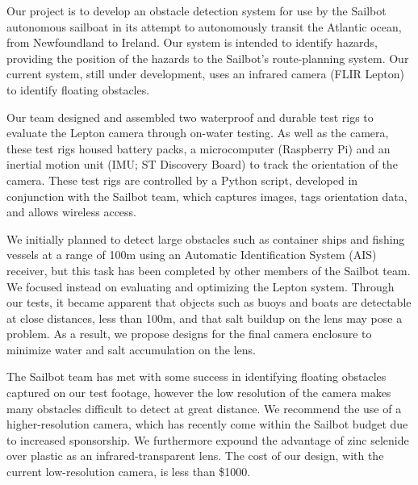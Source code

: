 Our project is to develop an obstacle detection system for use by the Sailbot autonomous sailboat in its attempt to autonomously transit the Atlantic ocean, from Newfoundland to Ireland. Our system is intended to identify hazards, providing the position of the hazards to the Sailbot's route-planning system. Our current system, still under development, uses an infrared camera (FLIR Lepton) to identify floating obstacles.

Our team designed and assembled two waterproof and durable test rigs to evaluate the Lepton camera through on-water testing. As well as the camera, these test rigs housed battery packs, a microcomputer (Raspberry Pi) and an inertial motion unit (IMU; ST Discovery Board) to track the orientation of the camera. These test rigs are controlled by a Python script, developed in conjunction with the Sailbot team, which captures images, tags orientation data, and allows wireless access.

We initially planned to detect large obstacles such as container ships and fishing vessels at a range of 100m using an Automatic Identification System (AIS) receiver, but this task has been completed by other members of the Sailbot team. We focused instead on evaluating and optimizing the Lepton system. Through our tests, it became apparent that objects such as buoys and boats are detectable at close distances, less than 100m, and that salt buildup on the lens may pose a problem. As a result, we propose designs for the final camera enclosure to minimize water and salt accumulation on the lens.

The Sailbot team has met with some success in identifying floating obstacles captured on our test footage, however the low resolution of the camera makes many obstacles difficult to detect at great distance. We recommend the use of a higher-resolution camera, which has recently come within the Sailbot budget due to increased sponsorship. We furthermore expound the advantage of zinc selenide over plastic as an infrared-transparent lens. The cost of our design, with the current low-resolution camera, is less than \$1000.
